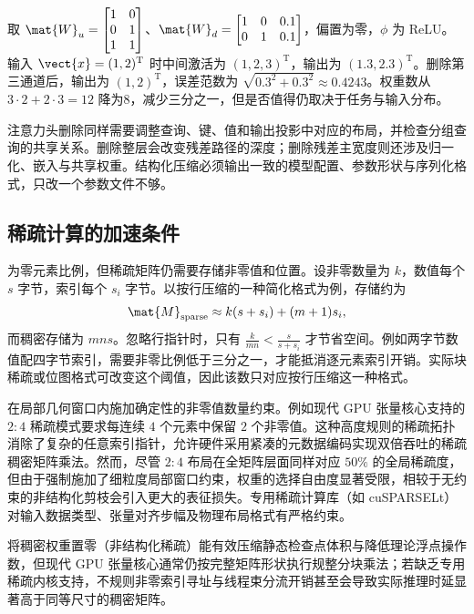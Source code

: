 \documentclass[../textbook.tex]{subfiles}
\begin{document}
取 $\mat{W}_u=\begin{bmatrix}1&0\\0&1\\1&1\end{bmatrix}$、$\mat{W}_d=\begin{bmatrix}1&0&0.1\\0&1&0.1\end{bmatrix}$，偏置为零，$\phi$ 为 ReLU。输入 $\vect{x}=(1,2)^{\mathrm{T}}$ 时中间激活为 $(1,2,3)^{\mathrm{T}}$，输出为 $(1.3,2.3)^{\mathrm{T}}$。删除第三通道后，输出为 $(1,2)^{\mathrm{T}}$，误差范数为 $\sqrt{0.3^2+0.3^2}\approx0.4243$。权重数从 $3\cdot2+2\cdot3=12$ 降为8，减少三分之一，但是否值得仍取决于任务与输入分布。

注意力头删除同样需要调整查询、键、值和输出投影中对应的布局，并检查分组查询的共享关系。删除整层会改变残差路径的深度；删除残差主宽度则还涉及归一化、嵌入与共享权重。结构化压缩必须输出一致的模型配置、参数形状与序列化格式，只改一个参数文件不够。

\subsection{稀疏计算的加速条件}

为零元素比例，但稀疏矩阵仍需要存储非零值和位置。设非零数量为 $k$，数值每个 $s$ 字节，索引每个 $s_i$ 字节。以按行压缩的一种简化格式为例，存储约为
\begin{equation}
 \mat{M}_{\mathrm{sparse}}\approx k(s+s_i)+(m+1)s_i,
\end{equation}
而稠密存储为 $mns$。忽略行指针时，只有 $\frac{k}{mn}<\frac{s}{s+s_i}$ 才节省空间。例如两字节数值配四字节索引，需要非零比例低于三分之一，才能抵消逐元素索引开销。实际块稀疏或位图格式可改变这个阈值，因此该数只对应按行压缩这一种格式。

在局部几何窗口内施加确定性的非零值数量约束。例如现代 GPU 张量核心支持的 $2:4$ 稀疏模式要求每连续 $4$ 个元素中保留 $2$ 个非零值。这种高度规则的稀疏拓扑消除了复杂的任意索引指针，允许硬件采用紧凑的元数据编码实现双倍吞吐的稀疏稠密矩阵乘法。然而，尽管 $2:4$ 布局在全矩阵层面同样对应 $50\%$ 的全局稀疏度，但由于强制施加了细粒度局部窗口约束，权重的选择自由度显著受限，相较于无约束的非结构化剪枝会引入更大的表征损失。专用稀疏计算库（如 cuSPARSELt）对输入数据类型、张量对齐步幅及物理布局格式有严格约束\cite{nvidia2026cusparselt}。

\begin{warning}[非结构化稀疏的硬件加速陷阱]
将稠密权重置零（非结构化稀疏）能有效压缩静态检查点体积与降低理论浮点操作数，但现代 GPU 张量核心通常仍按完整矩阵形状执行规整分块乘法；若缺乏专用稀疏内核支持，不规则非零索引寻址与线程束分流开销甚至会导致实际推理时延显著高于同等尺寸的稠密矩阵。
\end{warning}
\end{document}
